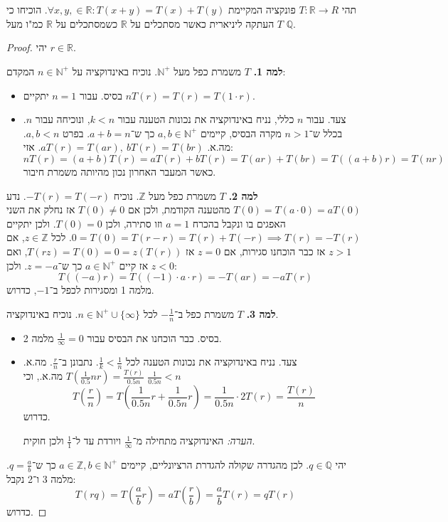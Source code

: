 \documentclass[]{article}
\newcommand\N     {\mathbb{N}}
\newcommand\Z     {\mathbb{Z}}
\newcommand\R     {\mathbb{R}}
\newcommand\Q     {\mathbb{Q}}
\renewcommand\inf {\infty}
\newcommand\co        {\colon}
\newcommand\cl [1]    {\left ( #1 \right )}
\begin{document}
	\section{}
	תהי $T \co \R\to R$ פונקציה המקיימת $\forall x, y,  \in \R\co T(x + y) = T(x)  +T(y)$. הוכיחו כי $T$ העתקה ליניארית כאשר מסתכלים על $\R$ כשמסתכלים על $\R$ כמ"ו מעל $\Q$. 
	\begin{proof} יהי $r \in \R$. 
		
		\textbf{למה 1. }$T$ משמרת כפל מעל $\N^+$. נוכיח באינדוקציה על $n \in \N^+$ המקדם: 
		\begin{itemize}
			\item בסיס. עבור $n = 1$ יתקיים $nT(r) = T(r) = T(1 \cdot r)$. 
			\item צעד. עבור $n$ כללי, נניח באינדוקציה את נכונות הטענה עבור $k < n$, ונוכיחה עבור $n$. בכלל ש־$n > 1$ מקרה הבסיס, קיימים $a, b \in \N^+$ כך ש־$a + b = n$. בפרט $a, b < n$. מה.א. $aT(r) = T(ar), \ bT(r) = T(br)$. 
			אזי: 
			\[ nT(r) = (a + b)T(r) = aT(r) + bT(r) = T(ar) + T(br) = T((a + b)r) = T(nr) \]
			כאשר המעבר האחרון נכון מהיותה משמרת חיבור. 
		\end{itemize}
		
		\textbf{למה 2. }$T$ משמרת כפל מעל $\Z$. נוכיח $-T(r) = T(-r)$. נדע $T(0) = T(a \cdot 0) = aT(0)$ מהטענה הקודמת, ולכן אם $T(0) \neq 0$ אז נחלק את השני האפגים בו ונקבל בהכרח $a = 1$ וזו סתירה, ולכן $T(0) = 0$. ולכן 		
		יתקיים $0 = T(0) = T(r - r) = T(r)  + T(-r) \implies T(r) = -T(r)$. לכל $z \in \Z$, אם $z > 1$ אז כבר הוכחנו סגירות, אם $z = 0$ אז $T(rz) = T(0) = 0 = z(T(r))$, ואם $z < 0$ אז קיים $a \in \N^+$ כך ש־$z = -a$. ולכן: 
		\[ T((-a)r) = T((-1) \cdot a \cdot r) = -T(ar) = -aT(r) \]
		מלמה 1 ומסגירות לכפל ב־$-1$, כדרוש. 
		
		\textbf{למה 3. }$T$ משמרת כפל ב־$-\frac{1}{n}$ לכל $n \in \N^+ \cup \{\inf\}$. נוכיח באינדוקציה. 
		\begin{itemize}
			\item בסיס. כבר הוכחנו את הבסיס עבור $\frac{1}{\inf} = 0$ מלמה 2. 
			\item צעד. נניח באינדוקציה את נכונות הטענה לכל $\frac{1}{k} < \frac{1}{n}$. נתבונן ב־$\frac{r}{n}$. מה.א. $T\cl{\frac{1}{0.5}n r} = \frac{T(r)}{0.5n}$ מה.א., וכי $\frac{1}{0.5n} < n$
			\[ T\cl{\frac{r}{n}} = T\cl{\frac{1}{0.5n}r + \frac{1}{0.5n}r} = \frac{1}{0.5n} \cdot 2T\cl{r} = \frac{T(r)}{n} \]
			כדרוש. 
			
			\textit{הערה: }האינדוקציה מתחילה מ־$\frac{1}{\inf}$ ויורדת עד ל־$\frac{1}{1}$ ולכן חוקית. 
		\end{itemize}
		
		יהי $q \in \Q$. לכן מהגדרה שקולה להגדרת הרציונליים, קיימים $a \in \Z, b \in \N^+$ כך ש־$q = \frac{a}{b}$. 
		מלמה 3 ו־2 נקבל: 
		\[ T(rq) = T\cl{\frac{a}{b}r} = aT\cl{\frac{r}{b}} = \frac{a}{b}T(r) = qT(r) \]
		כדרוש. 
	\end{proof}
\end{document}
